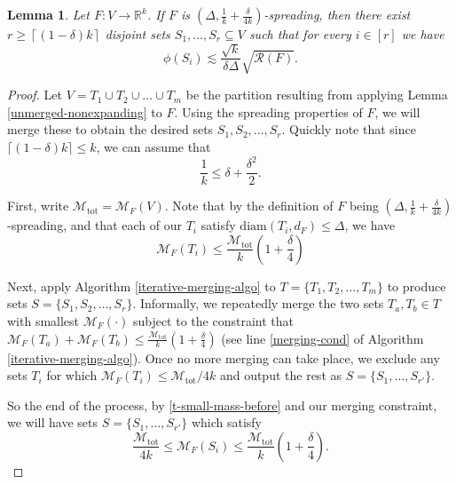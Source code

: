\documentclass[a4paper,11pt]{article}
\newtheorem{lemma}[theorem]{Lemma}
\theoremstyle{definition}
\newcommand{\R}{\mathbb{R}}
\newcommand{\rayleigh}[1]{\mathcal{R}\left(#1\right)}
\newcommand{\diam}[1]{\mathrm{diam}\left(#1\right)}
\newcommand{\mass}[1]{\mathcal{M}_F\left(#1\right)}
\newcommand{\mtot}{\mathcal{M}_\mathrm{tot}}
\begin{document}
\begin{lemma}\label{merging}
Let $F: V \to \R^k$. If $F$ is $\left(\Delta, \frac{1}{k} + \frac{\delta}{4k}\right)$-spreading, then there exist $r \ge \left\lceil(1 - \delta)k\right\rceil$ disjoint sets $S_1, \dots, S_r \subseteq V$ such that for every $i \in [r]$ we have
\[ \phi(S_i) \lesssim \frac{\sqrt{k}}{\delta \Delta} \sqrt{\rayleigh{F}}. \]
\end{lemma}
\begin{proof}

Let $V = T_1 \cup T_2 \cup \dots \cup T_m$ be the partition resulting from applying Lemma \ref{unmerged-nonexpanding} to $F$. Using the spreading properties of $F$, we will merge these to obtain the desired sets $S_1, S_2, \dots, S_r$. Quickly note that since $\lceil (1 - \delta)k \rceil \le k$, we can assume that
\begin{equation}\label{delta-k-bound}
\frac{1}{k} \le \delta + \frac{\delta^2}{2}.
\end{equation}

\medskip

First, write $\mtot = \mass{V}$. Note that by the definition of $F$ being $(\Delta, \frac{1}{k} + \frac{\delta}{4k})$-spreading, and that each of our $T_i$ satisfy $\diam{T_i, d_F} \le \Delta$, we have 
\begin{equation}\label{t-small-mass-before}
\mass{T_i} \le \frac{\mtot}{k}\left(1 + \frac{\delta}{4}\right)
\end{equation}

Next, apply Algorithm \ref{iterative-merging-algo} to $T = \{T_1, T_2, \dots, T_m\}$ to produce sets $S = \{S_1, S_2, \dots, S_r\}$. Informally, we repeatedly merge the two sets $T_a, T_b \in T$ with smallest $\mass{\cdot}$ subject to the constraint that $\mass{T_a} + \mass{T_b} \le \frac{\mtot}{k}\left(1 + \frac{\delta}{4}\right)$ (see line \ref{merging-cond} of Algorithm \ref{iterative-merging-algo}). Once no more merging can take place, we exclude any sets $T_i$ for which $\mass{T_i} \le \mtot/4k$ and output the rest as $S = \{S_1, \dots, S_{r'}\}$.

So the end of the process, by \ref{t-small-mass-before} and our merging constraint, we will have sets $S = \{S_1, \dots, S_{r'}\}$ which satisfy
\begin{equation}\label{si-mass-bound}
\frac{\mtot}{4k} \le \mass{S_i} \le \frac{\mtot}{k}\left(1 + \frac{\delta}{4}\right).
\end{equation}


\end{proof}
\end{document}
